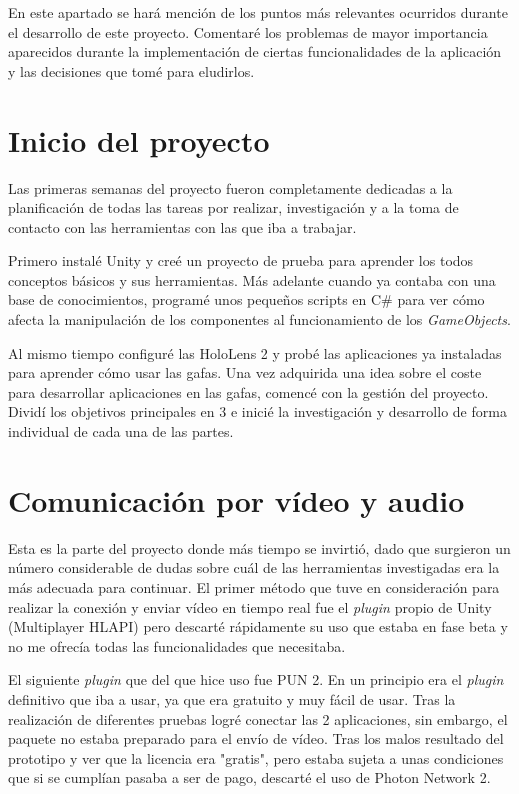 
En este apartado se hará mención de los puntos más relevantes ocurridos durante el desarrollo de este proyecto. Comentaré los problemas de mayor importancia aparecidos durante la implementación de ciertas funcionalidades de la aplicación y las decisiones que tomé para eludirlos.

\section{Inicio del proyecto}

Las primeras semanas del proyecto fueron completamente dedicadas a la planificación de todas las tareas por realizar, investigación y a la toma de contacto con las herramientas con las que iba a trabajar.

Primero instalé Unity y creé un proyecto de prueba para aprender los todos conceptos básicos y sus herramientas. Más adelante cuando ya contaba con una base de conocimientos, programé unos pequeños scripts en C\# para ver cómo afecta la manipulación de los componentes al funcionamiento de los \textit{GameObjects}.

Al mismo tiempo configuré las HoloLens 2 y probé las aplicaciones ya instaladas para aprender cómo usar las gafas. Una vez adquirida una idea sobre el coste para desarrollar aplicaciones en las gafas, comencé con la gestión del proyecto.
Dividí los objetivos principales en 3 e inicié la investigación y desarrollo de forma individual de cada una de las partes. 

\section{Comunicación por vídeo y audio}

Esta es la parte del proyecto donde más tiempo se invirtió, dado que surgieron un número considerable de dudas sobre cuál de las herramientas investigadas era la más adecuada para continuar. El primer método que tuve en consideración para realizar la conexión y enviar vídeo en tiempo real fue el \textit{plugin} propio de Unity (Multiplayer HLAPI) \cite{unity:multiplayer} pero descarté rápidamente su uso que estaba en fase beta y no me ofrecía todas las funcionalidades que necesitaba.

El siguiente \textit{plugin} que del que hice uso fue PUN 2. En un principio era el \textit{plugin} definitivo que iba a usar, ya que era gratuito y muy fácil de usar. Tras la realización de diferentes pruebas logré conectar las 2 aplicaciones, sin embargo, el paquete no estaba preparado para el envío de vídeo. Tras los malos resultado del prototipo y ver que la licencia era "gratis", pero estaba sujeta a unas condiciones que si se cumplían pasaba a ser de pago, descarté el uso de Photon Network 2.

